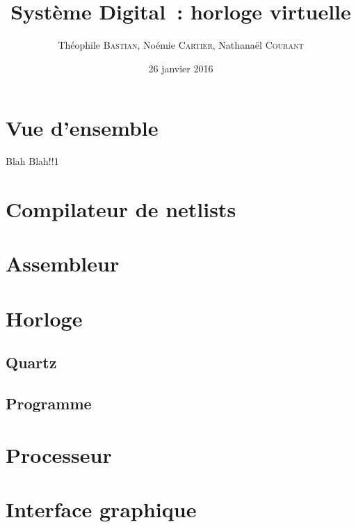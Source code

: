 \documentclass[11pt]{beamer}
\author{Théophile \textsc{Bastian}, Noémie \textsc{Cartier}, Nathanaël \textsc{Courant}}
\title{Système Digital~: horloge virtuelle}
\date{26 janvier 2016}
\begin{document}
\begin{frame}
\titlepage
\end{frame}


\section*{Vue d'ensemble}

\begin{frame}{Blah}
Blah!!1
\end{frame}


\begin{frame}
\tableofcontents
\end{frame}

\section{Compilateur de netlists}


\section{Assembleur}



\section{Horloge}

\subsection{Quartz}

\subsection{Programme}



\section{Processeur}



\section{Interface graphique}
\end{document}
